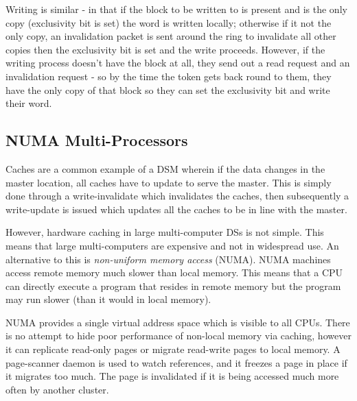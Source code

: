Writing is similar - in that if the block to be written to is present and is the only copy (exclusivity bit is set) the word is written locally; otherwise if it not the only copy, an invalidation packet is sent around the ring to invalidate all other copies then the exclusivity bit is set and the write proceeds. However, if the writing process doesn't have the block at all, they send out a read request and an invalidation request - so by the time the token gets back round to them, they have the only copy of that block so they can set the exclusivity bit and write their word. 

\subsection{NUMA Multi-Processors}
Caches are a common example of a DSM wherein if the data changes in the master location, all caches have to update to serve the master. This is simply done through a write-invalidate which invalidates the caches, then subsequently a write-update is issued which updates all the caches to be in line with the master.

However, hardware caching in large multi-computer DSs is not simple. This means that large multi-computers are expensive and not in widespread use. An alternative to this is \textit{non-uniform memory access} (NUMA). NUMA machines access remote memory much slower than local memory. This means that a CPU can directly execute a program that resides in remote memory but the program may run slower (than it would in local memory). 

NUMA provides a single virtual address space which is visible to all CPUs. There is no attempt to hide poor performance of non-local memory via caching, however it can replicate read-only pages or migrate read-write pages to local memory. A page-scanner daemon is used to watch references, and it freezes a page in place if it migrates too much. The page is invalidated if it is being accessed much more often by another cluster. 